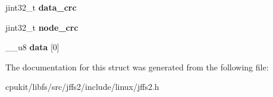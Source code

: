 \begin{DoxyCompactItemize}
\item 
\mbox{\label{structjffs2__raw__xattr_aa518b9d05acc6f2d7406cda518936af3}} 
jint32\+\_\+t {\bfseries data\+\_\+crc}
\item 
\mbox{\label{structjffs2__raw__xattr_ae4662b669378d42a00653cd426099c7d}} 
jint32\+\_\+t {\bfseries node\+\_\+crc}
\item 
\mbox{\label{structjffs2__raw__xattr_a9330cca5c1b34b409b180eeda90e91e1}} 
\+\_\+\+\_\+u8 {\bfseries data} \mbox{[}0\mbox{]}
\end{DoxyCompactItemize}


The documentation for this struct was generated from the following file\+:\begin{DoxyCompactItemize}
\item 
cpukit/libfs/src/jffs2/include/linux/jffs2.\+h\end{DoxyCompactItemize}
